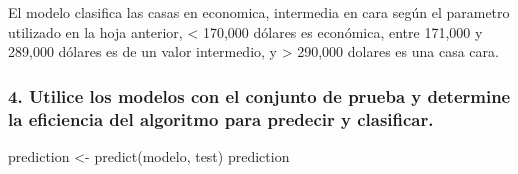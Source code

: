 \documentclass[
]{article}
\newenvironment{Shaded}{\begin{snugshade}}{\end{snugshade}}
\newcommand{\FunctionTok}[1]{\textcolor[rgb]{0.00,0.00,0.00}{#1}}
\newcommand{\NormalTok}[1]{#1}
\newcommand{\OtherTok}[1]{\textcolor[rgb]{0.56,0.35,0.01}{#1}}
\begin{document}
El modelo clasifica las casas en economica, intermedia en cara según el
parametro utilizado en la hoja anterior, \textless{} 170,000 dólares es
económica, entre 171,000 y 289,000 dólares es de un valor intermedio, y
\textgreater{} 290,000 dolares es una casa cara.

\hypertarget{utilice-los-modelos-con-el-conjunto-de-prueba-y-determine-la-eficiencia-del-algoritmo-para-predecir-y-clasificar.}{%
\subsubsection{4. Utilice los modelos con el conjunto de prueba y
determine la eficiencia del algoritmo para predecir y
clasificar.}\label{utilice-los-modelos-con-el-conjunto-de-prueba-y-determine-la-eficiencia-del-algoritmo-para-predecir-y-clasificar.}}

\begin{Shaded}
\begin{Highlighting}[]
\NormalTok{prediction }\OtherTok{\textless{}{-}} \FunctionTok{predict}\NormalTok{(modelo, test)}
\NormalTok{prediction}
\end{Highlighting}
\end{Shaded}
\end{document}
